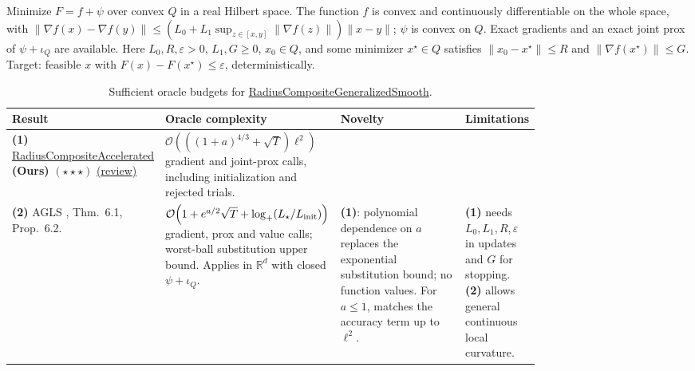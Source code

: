 \begin{table}[tp]
\centering
\caption{Sufficient oracle budgets for \href{https://github.com/k3nfalt/longtails/blob/main/LongTails/Setups/RadiusCompositeGeneralizedSmooth.lean}{RadiusCompositeGeneralizedSmooth}.}\label{tab:RadiusCompositeGeneralizedSmooth}
\parbox{\linewidth}{\footnotesize Minimize $F=f+\psi$ over convex $Q$ in a real Hilbert space. The function $f$ is convex and continuously differentiable on the whole space, with $\|\nabla f(x)-\nabla f(y)\|\leq(L_0+L_1\sup_{z\in[x,y]}\|\nabla f(z)\|)\|x-y\|$; $\psi$ is convex on $Q$. Exact gradients and an exact joint prox of $\psi+\iota_Q$ are available. Here $L_0,R,\varepsilon>0$, $L_1,G\geq0$, $x_0\in Q$, and some minimizer $x^\star\in Q$ satisfies $\|x_0-x^\star\|\leq R$ and $\|\nabla f(x^\star)\|\leq G$. Target: feasible $x$ with $F(x)-F(x^\star)\leq\varepsilon$, deterministically.}\par\smallskip
\begin{threeparttable}
\footnotesize
\setlength{\tabcolsep}{4pt}\renewcommand{\arraystretch}{1.25}
\begin{tabularx}{\linewidth}{@{}>{\raggedright\arraybackslash}p{0.20\linewidth}>{\raggedright\arraybackslash}p{0.32\linewidth}>{\raggedright\arraybackslash}p{0.25\linewidth}>{\raggedright\arraybackslash}X@{}}
\toprule
\textbf{Result} & \textbf{Oracle complexity} & \textbf{Novelty} & \textbf{Limitations} \\
\midrule
\textbf{(1)} \href{https://github.com/k3nfalt/longtails/blob/main/LongTails/Theorems/RadiusCompositeAccelerated.lean}{Radius\allowbreak Composite\allowbreak Accelerated} \textbf{(Ours)} $(\star\star\star)$ \href{https://github.com/k3nfalt/longtails/blob/main/scripts/reviews/RadiusCompositeAccelerated.md}{(review)}
& $\mathcal{O}\!\left(((1+a)^{4/3}+\sqrt T)\ell^2\right)$ gradient and joint-prox calls, including initialization and rejected trials.
& & \\
\midrule[1.2pt]
\textbf{(2)} AGLS \citep{rcaDengGaoV3}, Thm.~6.1, Prop.~6.2.
& $\mathcal{O}\!\left(1+e^{a/2}\sqrt T+\log_+(L_\star/L_{\rm init})\right)$ gradient, prox and value calls; worst-ball substitution upper bound. Applies in $\mathbb R^d$ with closed $\psi+\iota_Q$.
& \textbf{(1)}: polynomial dependence on $a$ replaces the exponential substitution bound; no function values. For $a\leq1$, matches the accuracy term up to $\ell^2$.
& \textbf{(1)} needs $L_0,L_1,R,\varepsilon$ in updates and $G$ for stopping. \textbf{(2)} allows general continuous local curvature. \\
\midrule

\end{tabularx}
\end{threeparttable}
\end{table}
